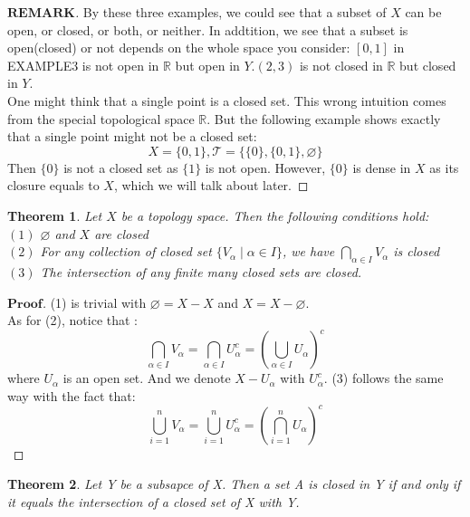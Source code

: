 \documentclass[a4paper, 11pt]{article}
\newtheorem{theorem}{Theorem}
\theoremstyle{remark}
\newenvironment{myremark}
{\renewcommand\qedsymbol{$ $}\begin{proof}[$\mathbf{REMARK}$]}
  {\end{proof}}
\newenvironment{myprf}
{\renewcommand\qedsymbol{$ $}\begin{proof}[$\mathbf{Proof}$]}
  {\end{proof}}
\theoremstyle{definition}
\begin{document}
\begin{myremark}
        By these three examples, we could see that a subset of $X$ can be open, or closed,
        or both, or neither. In addtition, we see that a subset is open(closed) or not depends on
        the whole space you consider: $[0,1]$ in EXAMPLE3 is not open in $\mathbb{R}$ but
        open in $Y$.$(2,3)$ is not closed in $\mathbb{R}$ but closed in $Y$.\\
        \indent One might think that a single point is a closed set. This wrong 
        intuition comes from the special topological space $\mathbb{R}$. But the
        following example shows exactly that a single point might not be a closed
        set:
        $$
        X=\{0,1\}, \mathcal{T}=\{\{0\}, \{0,1\}, \varnothing\}
        $$ Then $\{0\}$ is not a closed set as $\{1\}$ is not open. However, 
        $\{0\}$ is dense in $X$ as its closure equals to $X$, which we will talk
        about later.
\end{myremark}
\vspace{0.5cm}
\begin{theorem}
        Let $X$ be a topology space. Then the following conditions hold:\\
        $\mathrm{(1)}$ $\varnothing$ and $X$ are closed\\
        $\mathrm{(2)}$ For any collection of closed set $\{V_{\alpha}\mid \alpha\in I\}$, we have
        $\displaystyle \bigcap_{\alpha\in I}V_{\alpha}$ is closed\\
        $\mathrm{(3)}$ The intersection of any finite many closed sets are closed.\\
\end{theorem}
\begin{myprf}
        (1) is trivial with $\varnothing=X-X$ and $X=X-\varnothing$.\\
        As for (2), notice that :\\
        $$
        \bigcap_{\alpha\in I}V_{\alpha}=\bigcap_{\alpha\in I}U_{\alpha}^{c}=
        (\bigcup_{\alpha\in I}U_{\alpha})^{c}
        $$ where $U_{\alpha}$ is an open set. And we denote $X-U_{\alpha}$ with 
        $U_{\alpha}^{c}$. (3) follows the same way with the fact that:
        $$\bigcup_{i=1}^{n} V_{\alpha}=\bigcup_{i=1}^{n} U_{\alpha}^{c}=
        (\bigcap_{i=1}^{n} U_{\alpha})^{c}$$
\end{myprf}
\vspace{0.5cm}
\begin{theorem}
    Let Y be a subsapce of X. Then a set A is closed in Y if and only if it equals the intersection of a closed set of X with Y.        
\end{theorem}
\end{document}
